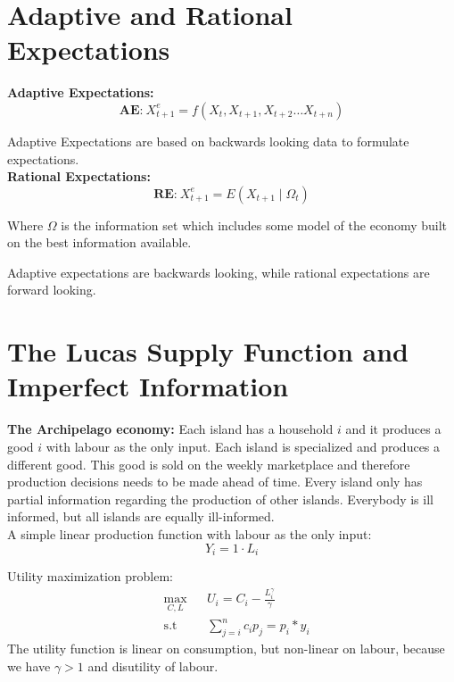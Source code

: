 
\section{Adaptive and Rational Expectations}
\textbf{Adaptive Expectations:}
\begin{equation*}
    \textbf{AE:} \ X^{e}_{t+1} = f(X_{t}, X_{t+1}, X_{t+2} \dots X_{t+n})
\end{equation*}

Adaptive Expectations are based on backwards looking data to formulate expectations. 
\\

\textbf{Rational Expectations:}
\begin{equation*}
    \textbf{RE:} \ X^{e}_{t+1} = E(X_{t+1}\mid \Omega_t )
\end{equation*}

Where $\Omega$ is the information set which includes some model of the economy built on the best information available. 

Adaptive expectations are backwards looking, while rational expectations are forward looking.

\section{The Lucas Supply Function and Imperfect Information}
\textbf{The Archipelago economy:}
Each island has a household $i$ and it produces a good $i$ with labour as the only input. Each island is specialized and produces a different good. This good is sold on the weekly marketplace and therefore production decisions needs to be made ahead of time. Every island only has partial information regarding the production of other islands. Everybody is ill informed, but all islands are equally ill-informed.  \\

A simple linear production function with labour as the only input:
\begin{equation*}
    Y_i = 1 \cdot L_i
\end{equation*}

Utility maximization problem: 
\begin{equation*}
\begin{aligned}
& \underset{C, L}{\max}
& & U_i = C_i - \frac{L_{i}^{\gamma}}{\gamma} \\
& \text{s.t}
& & \sum^{n}_{j = i} c_i p_j = p_i * y_i
\end{aligned}
\end{equation*}
The utility function is linear on consumption, but non-linear on labour, because we have $\gamma > 1$ and disutility of labour. 


